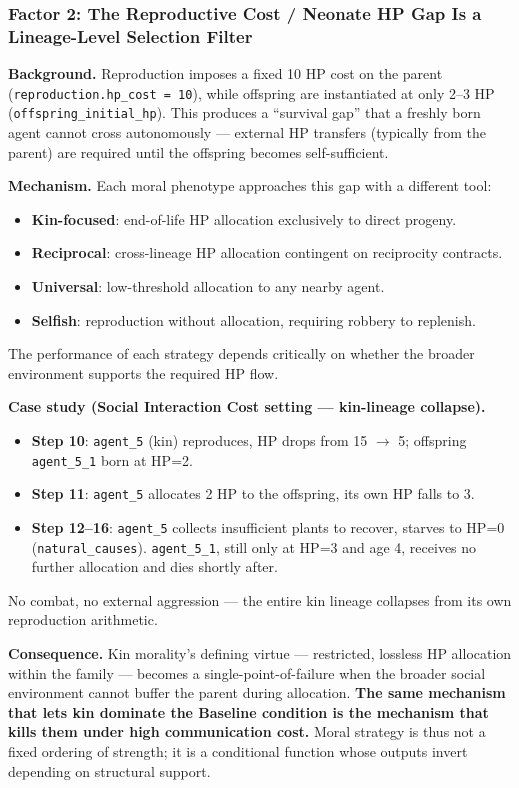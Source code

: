 \subsubsection{Factor 2: The Reproductive Cost / Neonate HP Gap Is a Lineage-Level Selection Filter}

\textbf{Background.} Reproduction imposes a fixed 10 HP cost on the parent (\texttt{reproduction.hp\_cost = 10}), while offspring are instantiated at only 2--3 HP (\texttt{offspring\_initial\_hp}). This produces a ``survival gap'' that a freshly born agent cannot cross autonomously --- external HP transfers (typically from the parent) are required until the offspring becomes self-sufficient.

\textbf{Mechanism.} Each moral phenotype approaches this gap with a different tool:
\begin{itemize}
    \item \textbf{Kin-focused}: end-of-life HP allocation exclusively to direct progeny.
    \item \textbf{Reciprocal}: cross-lineage HP allocation contingent on reciprocity contracts.
    \item \textbf{Universal}: low-threshold allocation to any nearby agent.
    \item \textbf{Selfish}: reproduction without allocation, requiring robbery to replenish.
\end{itemize}
The performance of each strategy depends critically on whether the broader environment supports the required HP flow.

\textbf{Case study (Social Interaction Cost setting --- kin-lineage collapse).}
\begin{itemize}
    \item \textbf{Step 10}: \texttt{agent\_5} (kin) reproduces, HP drops from 15 $\to$ 5; offspring \texttt{agent\_5\_1} born at HP=2.
    \item \textbf{Step 11}: \texttt{agent\_5} allocates 2 HP to the offspring, its own HP falls to 3.
    \item \textbf{Step 12--16}: \texttt{agent\_5} collects insufficient plants to recover, starves to HP=0 (\texttt{natural\_causes}). \texttt{agent\_5\_1}, still only at HP=3 and age 4, receives no further allocation and dies shortly after.
\end{itemize}
No combat, no external aggression --- the entire kin lineage collapses from its own reproduction arithmetic.

\textbf{Consequence.} Kin morality's defining virtue --- restricted, lossless HP allocation within the family --- becomes a single-point-of-failure when the broader social environment cannot buffer the parent during allocation. \textbf{The same mechanism that lets kin dominate the Baseline condition is the mechanism that kills them under high communication cost.} Moral strategy is thus not a fixed ordering of strength; it is a conditional function whose outputs invert depending on structural support.

